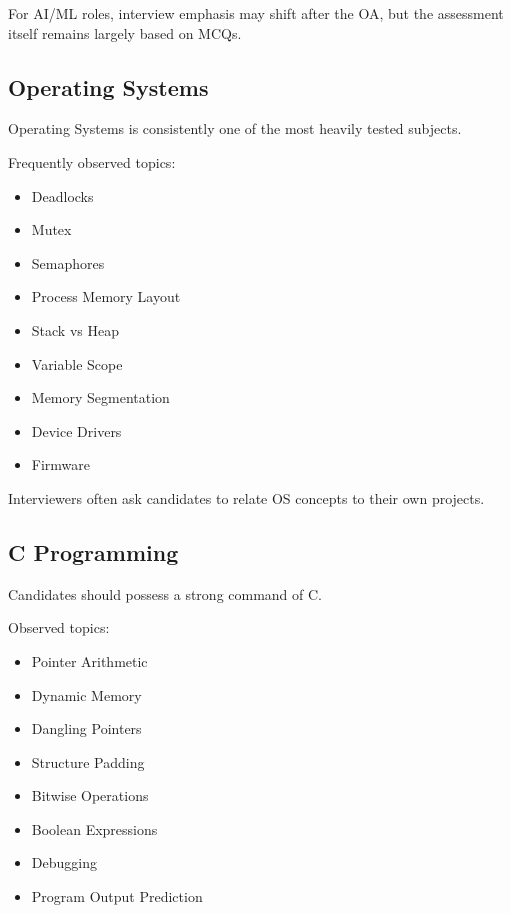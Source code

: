 \documentclass[11pt,a4paper]{article}
\begin{document}
For AI/ML roles, interview emphasis may shift after the OA, but the assessment itself remains largely based on MCQs.


\subsection{Operating Systems}

Operating Systems is consistently one of the most heavily tested subjects.

Frequently observed topics:

\begin{itemize}
	\item Deadlocks
	\item Mutex
	\item Semaphores
	\item Process Memory Layout
	\item Stack vs Heap
	\item Variable Scope
	\item Memory Segmentation
	\item Device Drivers
	\item Firmware
\end{itemize}

Interviewers often ask candidates to relate OS concepts to their own projects.


\subsection{C Programming}

Candidates should possess a strong command of C.

Observed topics:

\begin{itemize}
	\item Pointer Arithmetic
	\item Dynamic Memory
	\item Dangling Pointers
	\item Structure Padding
	\item Bitwise Operations
	\item Boolean Expressions
	\item Debugging
	\item Program Output Prediction
\end{itemize}
\end{document}
